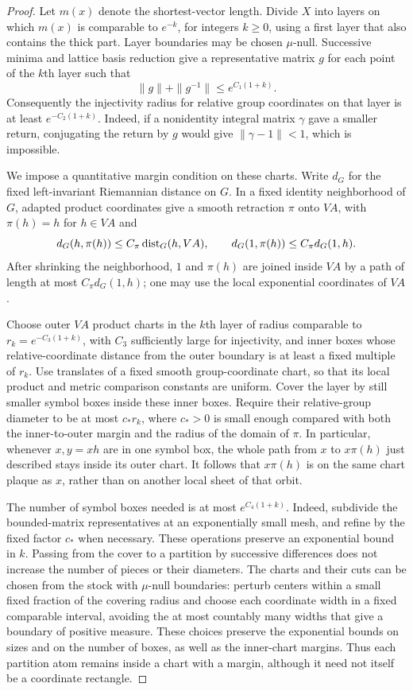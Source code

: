 \begin{proof}
Let $m(x)$ denote the shortest-vector length.  Divide $X$ into layers on
which $m(x)$ is comparable to $e^{-k}$, for integers $k\geq0$, using a
first layer that also contains the thick part.  Layer boundaries may be
chosen $\mu$-null.  Successive minima and lattice basis reduction give a
representative matrix $g$ for each point of the $k$th layer such that
\[
 \|g\|+\|g^{-1}\|\leq e^{C_1(1+k)}.
\]
Consequently the injectivity radius for relative group coordinates on that
layer is at least $e^{-C_2(1+k)}$.  Indeed, if a nonidentity integral matrix
$\gamma$ gave a smaller return, conjugating the return by $g$ would give
$\|\gamma-1\|<1$, which is impossible.

We impose a quantitative margin condition on these charts.  Write $d_G$
for the fixed left-invariant Riemannian distance on $G$.  In a fixed
identity neighborhood of $G$, adapted product coordinates give a smooth
retraction $\pi$ onto $VA$, with $\pi(h)=h$ for $h\in VA$ and
\[
 d_G(h,\pi(h))\leq C_{\pi}\operatorname{dist}_G(h,VA),
 \qquad d_G(1,\pi(h))\leq C_{\pi}d_G(1,h).
\]
After shrinking the neighborhood, $1$ and $\pi(h)$ are joined inside
$VA$ by a path of length at most $C_{\pi}d_G(1,h)$; one may use the
local exponential coordinates of $VA$.

Choose outer $VA$ product charts in the $k$th layer of radius comparable
to $r_k=e^{-C_3(1+k)}$, with $C_3$ sufficiently large for injectivity,
and inner boxes whose relative-coordinate distance from the outer
boundary is at least a fixed multiple of $r_k$.  Use translates of a
fixed smooth group-coordinate chart, so that its local product and
metric comparison constants are uniform.  Cover the layer by still
smaller symbol boxes inside these inner boxes.  Require their
relative-group diameter to be at most $c_*r_k$, where $c_*>0$ is small
enough compared with both the inner-to-outer margin and the radius of
the domain of $\pi$.  In particular, whenever $x,y=xh$ are in one
symbol box, the whole path from $x$ to $x\pi(h)$ just described stays
inside its outer chart.  It follows that $x\pi(h)$ is on the same
chart plaque as $x$, rather than on another local sheet of that orbit.

The number of symbol boxes needed is at most $e^{C_4(1+k)}$.
Indeed, subdivide the bounded-matrix representatives at an exponentially
small mesh, and refine by the fixed factor $c_*$ when necessary.  These
operations preserve an exponential bound in $k$.  Passing from the cover
to a partition by successive differences does not increase the number
of pieces or their diameters.  The charts and their cuts can be chosen
from the stock with $\mu$-null boundaries: perturb centers within a small
fixed fraction of the covering radius and choose each coordinate width
in a fixed comparable interval, avoiding the at most countably many
widths that give a boundary of positive measure.  These choices preserve
the exponential bounds on sizes and on the number of boxes, as well as
the inner-chart margins.  Thus each partition atom remains
inside a chart with a margin, although it need not itself be a coordinate
rectangle.


\end{proof}
